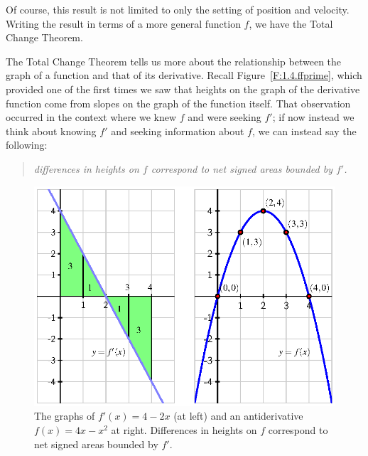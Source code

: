 Of course, this result is not limited to only the setting of position and velocity.  Writing the result in terms of a more general function $f$, we have the Total Change Theorem.

 \vspace*{5pt}
\nin {}
\vspace*{1pt}

The Total Change Theorem tells us more about the relationship between the graph of a function and that of its derivative.  Recall Figure~\ref{F:1.4.ffprime}, which provided one of the first times we saw that heights on the graph of the derivative function come from slopes on the graph of the function itself.  That observation occurred in the context where we knew $f$ and were seeking $f'$; if now instead we think about knowing $f'$ and seeking information about $f$, we can instead say the following:  
\begin{quote}
\emph{differences in heights on $f$ correspond to net signed areas bounded by $f'$.}
\end{quote}
\begin{figure}[h]
\begin{center}
\includegraphics{figures/4_4_TCT.eps}
\caption{The graphs of $f'(x) = 4 - 2x$ (at left) and an antiderivative $f(x) = 4x - x^2$ at right.  Differences in heights on $f$ correspond to net signed areas bounded by $f'$.} \label{F:4.4.TCT}
\end{center}
\end{figure}
